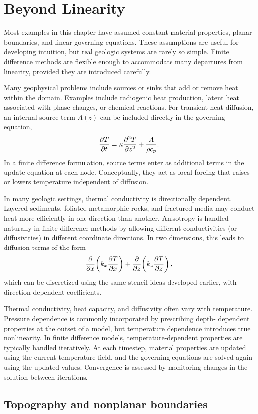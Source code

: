 \section{Beyond Linearity}

Most examples in this chapter have assumed constant material properties, planar boundaries, and linear governing equations. These assumptions are useful for developing intuition, but real geologic systems are rarely so simple.  Finite difference methods are flexible enough to accommodate many departures from linearity, provided they are introduced carefully.

Many geophysical problems include sources or sinks that add or remove heat within the domain. Examples include radiogenic heat production, latent heat associated with phase changes, or chemical reactions.  For transient heat diffusion, an internal source term $A(z)$ can be included directly in the governing equation,
\[
    \pdv{T}{t} = \kappa \pdv[2]{T}{z} + \frac{A}{\rho c_p}.
\]
In a finite difference formulation, source terms enter as additional terms in the update equation at each node. Conceptually, they act as local forcing that raises or lowers temperature independent of diffusion.

In many geologic settings, thermal conductivity is directionally dependent.  Layered sediments, foliated metamorphic rocks, and fractured media may conduct heat more efficiently in one direction than another.  Anisotropy is handled naturally in finite difference methods by allowing different conductivities (or diffusivities) in different coordinate directions. In two dimensions, this leads to diffusion terms of the form
\[
\pdv{}{x}\!\left(k_x \pdv{T}{x}\right)
+
\pdv{}{z}\!\left(k_z \pdv{T}{z}\right),
\]
which can be discretized using the same stencil ideas developed earlier, with direction-dependent coefficients.

Thermal conductivity, heat capacity, and diffusivity often vary with temperature. Pressure dependence is commonly incorporated by prescribing depth- dependent properties at the outset of a model, but temperature dependence introduces true nonlinearity.  In finite difference models, temperature-dependent properties are typically handled iteratively. At each timestep, material properties are updated using the current temperature field, and the governing equations are solved again using the updated values. Convergence is assessed by monitoring changes in the solution between iterations.

\subsection{Topography and nonplanar boundaries}

